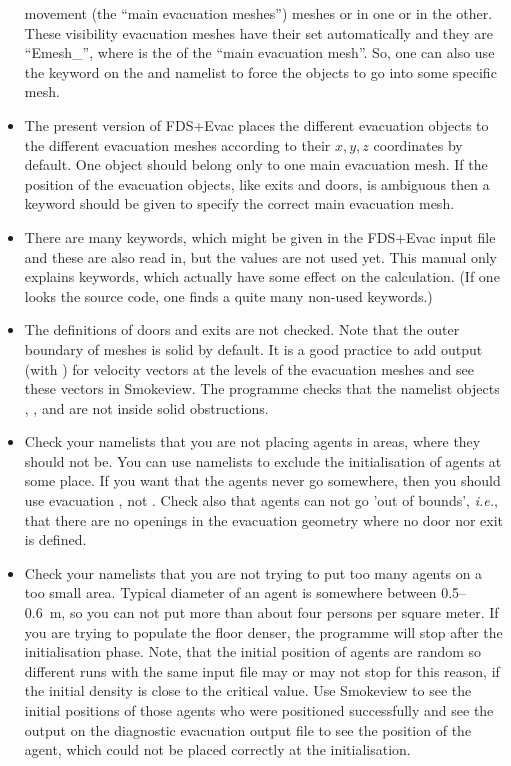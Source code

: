 \documentclass[12pt,a4paper,final,twoside]{stylevk}
\begin{document}
\begin{itemize}
  movement (the ``main evacuation meshes'') meshes or in one or in the
  other.  These visibility evacuation meshes have their  set
  automatically and they are ``Emesh\_'', where  is
  the  of the ``main evacuation mesh''.  So, one can also
  use the keyword  on the  and
   namelist to force the objects to go into some specific
  mesh.
%
\item The present version of FDS+Evac places the different evacuation
  objects to the different evacuation meshes according to their
  $x,y,z$ coordinates by default.  One object should belong only to
  one main evacuation mesh.  If the position of the evacuation
  objects, like exits and doors, is ambiguous then a keyword
   should be given to specify the correct main
  evacuation mesh.
%
\item There are many keywords, which might be given in the FDS+Evac
  input file and these are also read in, but the values are not used
  yet.  This manual only explains keywords, which actually have some
  effect on the calculation.  (If one looks the 
  source code, one finds a quite many non-used keywords.)
%
\item The definitions of doors and exits are not checked.  Note that
  the outer boundary of meshes is solid by default.  It is a good
  practice to add  output (with )
  for velocity vectors at the levels of the evacuation meshes and see
  these vectors in Smokeview.  The programme checks that the namelist
  objects , , and  are not inside
  solid obstructions.
%
\item Check your  namelists that you are not placing
  agents in areas, where they should not be.  You can use 
  namelists to exclude the initialisation of agents at some place.  If
  you want that the agents never go somewhere, then you should use
  evacuation , not .  Check also that agents
  can not go 'out of bounds', \emph{i.e.}, that there are no openings
  in the evacuation geometry where no door nor exit is defined.
%
\item Check your  namelists that you are not trying to put
  too many agents on a too small area.  Typical diameter of an agent
  is somewhere between 0.5--0.6~m, so you can not put more than about
  four persons per square meter.  If you are trying to populate the
  floor denser, the programme will stop after the initialisation
  phase.  Note, that the initial position of agents are random so
  different runs with the same input file may or may not stop for this
  reason, if the initial density is close to the critical value.  Use
  Smokeview to see the initial positions of those agents who were
  positioned successfully and see the output on the diagnostic
  evacuation output file  to see the position of
  the agent, which could not be placed correctly at the
  initialisation.
%
\end{itemize}
\end{document}
